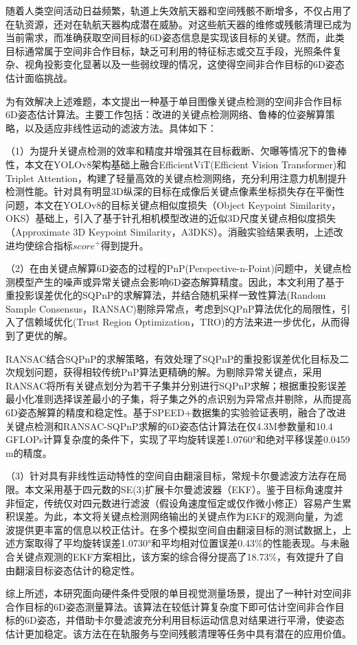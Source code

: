 随着人类空间活动日益频繁，轨道上失效航天器和空间残骸不断增多，不仅占用了在轨资源，还对在轨航天器构成潜在威胁。对这些航天器的维修或残骸清理已成为当前需求，而准确获取空间目标的6D姿态信息是实现该目标的关键。然而，此类目标通常属于空间非合作目标，缺乏可利用的特征标志或交互手段，光照条件复杂、视角投影变化显著以及一些弱纹理的情况，这使得空间非合作目标的6D姿态估计面临挑战。

为有效解决上述难题，本文提出一种基于单目图像关键点检测的空间非合作目标6D姿态估计算法。主要工作包括：改进的关键点检测网络、鲁棒的位姿解算策略，以及适应非线性运动的滤波方法。具体如下：

（1）为提升关键点检测的效率和精度并增强其在目标截断、欠曝等情况下的鲁棒性，本文在YOLOv8架构基础上融合EfficientViT(Efficient Vision Transformer)和Triplet Attention，构建了轻量高效的关键点检测网络，充分利用注意力机制提升检测性能。针对具有明显3D纵深的目标在成像后关键点像素坐标损失存在平衡性问题，本文在YOLOv8的目标关键点相似度损失（Object Keypoint Similarity，OKS）基础上，引入了基于针孔相机模型改进的近似3D尺度关键点相似度损失（Approximate 3D Keypoint Similarity，A3DKS）。消融实验结果表明，上述改进均使综合指标$score^+$得到提升。

（2）在由关键点解算6D姿态的过程的PnP(Perspective-n-Point)问题中，关键点检测模型产生的噪声或异常关键点会影响6D姿态解算精度。因此，本文利用了基于重投影误差优化的SQPnP的求解算法，并结合随机采样一致性算法(Random Sample Consensus，RANSAC)剔除异常点，考虑到SQPnP算法优化的局限性，引入了信赖域优化(Trust Region Optimization，TRO)的方法来进一步优化，从而得到了更优的解。

RANSAC结合SQPnP的求解策略，有效处理了SQPnP的重投影误差优化目标及二次规划问题，获得相较传统PnP算法更精确的解。为剔除异常关键点，采用RANSAC将所有关键点划分为若干子集并分别进行SQPnP求解；根据重投影误差最小化准则选择误差最小的子集，将子集之外的点识别为异常点并剔除，从而提高6D姿态解算的精度和稳定性。基于SPEED+数据集的实验验证表明，融合了改进关键点检测和RANSAC-SQPnP求解的6D姿态估计算法在仅4.3M参数量和10.4 GFLOPs计算复杂度的条件下，实现了平均旋转误差1.0760°和绝对平移误差0.0459 m的精度。

（3）针对具有非线性运动特性的空间自由翻滚目标，常规卡尔曼滤波方法存在局限。本文采用基于四元数的SE(3)扩展卡尔曼滤波器（EKF）。鉴于目标角速度并非恒定，传统仅对四元数进行滤波（假设角速度恒定或仅作微小修正）容易产生累积误差。为此，本文将关键点检测网络输出的关键点作为EKF的观测向量，为滤波提供更丰富的信息以校正估计。在多个模拟空间自由翻滚目标的测试数据上，上述方案取得了平均旋转误差1.0730°和平均相对位置误差0.43\%的性能表现。与未融合关键点观测的EKF方案相比，该方案的综合得分提高了18.73\%，有效提升了自由翻滚目标姿态估计的稳定性。

综上所述，本研究面向硬件条件受限的单目视觉测量场景，提出了一种针对空间非合作目标的6D姿态测量算法。该算法在较低计算复杂度下即可估计空间非合作目标的6D姿态，并借助卡尔曼滤波充分利用目标运动信息对结果进行平滑，使姿态估计更加稳定。该方法在在轨服务与空间残骸清理等任务中具有潜在的应用价值。
